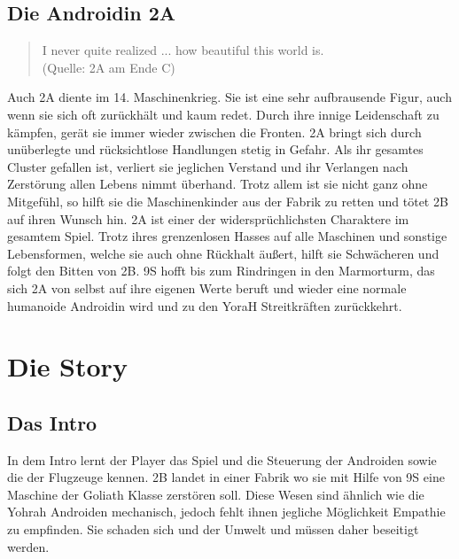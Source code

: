 \subsection{Die Androidin 2A}
\begin{quote}
	\dq I never quite realized ... how beautiful this world is.\dq \\ (Quelle: 2A am Ende C)
\end{quote}
Auch 2A diente im 14. Maschinenkrieg. Sie ist eine sehr aufbrausende Figur, auch wenn sie sich oft zurückhält und kaum redet. Durch ihre innige Leidenschaft zu kämpfen, gerät sie immer wieder zwischen die Fronten. 2A bringt sich durch unüberlegte und rücksichtlose Handlungen stetig in Gefahr. Als ihr gesamtes Cluster gefallen ist, verliert sie jeglichen Verstand und ihr Verlangen nach Zerstörung allen Lebens nimmt überhand. Trotz allem ist sie nicht ganz ohne Mitgefühl, so hilft sie die Maschinenkinder aus der Fabrik zu retten und tötet 2B auf ihren Wunsch hin. 2A ist einer der widersprüchlichsten Charaktere im gesamtem Spiel. Trotz ihres grenzenlosen Hasses auf alle Maschinen und sonstige Lebensformen, welche sie auch ohne Rückhalt äußert, hilft sie Schwächeren und folgt den Bitten von 2B. 9S hofft bis zum Rindringen in den Marmorturm, das sich 2A von selbst auf ihre eigenen Werte beruft und wieder eine normale humanoide Androidin wird und zu den YoraH Streitkräften zurückkehrt.
 

\section{Die Story}

\subsection{Das Intro}
In dem Intro lernt der Player das Spiel und die Steuerung der Androiden sowie die der Flugzeuge kennen. 2B landet in einer Fabrik wo sie mit Hilfe von 9S eine Maschine der Goliath Klasse zerstören soll. Diese Wesen sind ähnlich wie die Yohrah Androiden mechanisch, jedoch fehlt ihnen jegliche Möglichkeit Empathie zu empfinden. Sie schaden sich und der Umwelt und müssen daher beseitigt werden.

